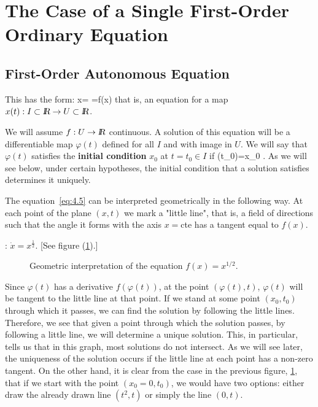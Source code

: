\section{The Case of a Single First-Order Ordinary Equation}

\subsection{First-Order Autonomous Equation}


This has the form:
\beq
\dot x= =f(x)   \label{eq:4.5}
\eeq
\noindent 
that is, an equation for a map $x(t):I \subset \re
\to U\subset \re$.

\noindent We will assume $f:U\to \mbox{\sl {l$\!\!\!\;\:\!$R}}$ continuous. A solution of this
equation will be a differentiable map $\varphi (t)$ defined for 
all $I$ and with image in $U$.
We will say that $\varphi (t)$ satisfies the {\bf initial condition}
$x_0$  at $t=t_0 \in I$ if 
\beq 
\varphi (t_0)=x_0 .   \label{eq:4.6}
\eeq   
As we will see below, under certain hypotheses, the initial
condition that a solution satisfies determines it uniquely.



The equation~\ref{eq:4.5} can be interpreted geometrically in the
following way. At each point of the plane $(x,t)$ we mark a
"little line", that is, a field of directions such that the
angle it forms with the axis $x=$cte has a tangent equal to $f(x)$.

\ejem: $\dot x = x^{\frac{1}{2}}$. [See figure (\ref{fig:4_1}).]


\begin{figure}[htbp]
  \begin{center}
    \caption{Geometric interpretation of the equation  $f(x)=x^{1/2}$.}
    \label{fig:4_1}
  \end{center}
\end{figure}

Since $\varphi (t)$ has a derivative $f(\varphi(t))$, at the point
$(\varphi(t),t)$, $\varphi(t)$ will be tangent to the little line at that
point. If we stand at some point $(x_0,t_0)$ through which it
passes, we can find the solution by following the little lines. Therefore,
we see that given a point through which the solution passes, by following
a little line, we will determine a unique solution. This, in particular,
tells us that in this graph, most solutions do not intersect.
As we will see later, the uniqueness of the solution occurs if the little line
at each point has a non-zero tangent. 
On the other hand, it is clear from the case in the previous figure, \ref{fig:4_1}, that if
we start with the point $(x_0=0,t_0)$, we would have two options: either
draw the already drawn line $(t^2,t)$ or simply the line $(0,t)$. 
\espa

